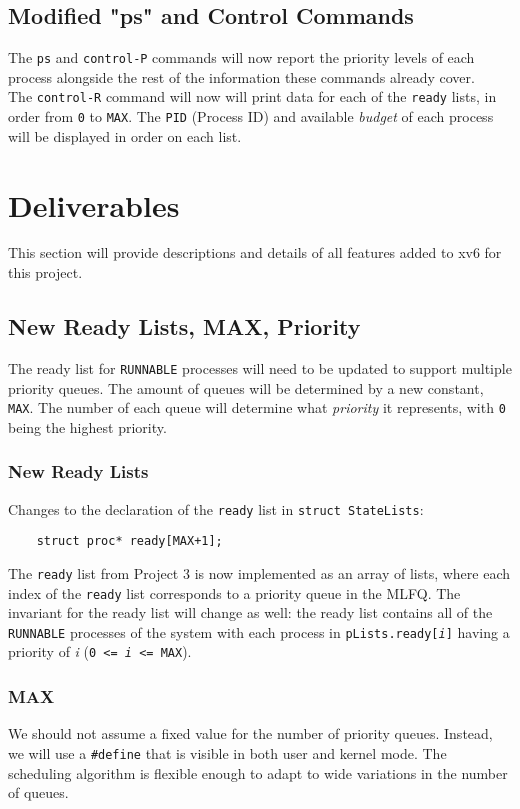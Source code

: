 \documentclass[11pt,letterpaper]{report}
\begin{document}
	\subsection{Modified "ps" and Control Commands}
	
	The {\tt ps} and {\tt control-P} commands will now report the priority levels of each process alongside the rest of the information these commands already cover.\\
	The {\tt control-R} command will now will print data for each of the {\tt ready} lists, in order from {\tt 0} to {\tt MAX}. The {\tt PID} (Process ID) and available \emph{budget} of each process will be displayed in order on each list.
	
	\newpage
	\section{Deliverables}
	This section will provide descriptions and details of all features added to xv6 for this project.
	
	\subsection{New Ready Lists, MAX, Priority}
	The ready list for {\tt RUNNABLE} processes will need to be updated to support multiple priority queues. The amount of queues will be determined by a new constant, {\tt MAX}. The number of each queue will determine what \emph{priority} it represents, with {\tt 0} being the highest priority.
	
	\subsubsection{New Ready Lists}
	Changes to the declaration of the {\tt ready} list in {\tt struct StateLists}:
	\begin{verbatim}
	struct proc* ready[MAX+1];
	\end{verbatim}
	The {\tt ready} list from Project 3 is now implemented as an array of lists, where each index of the {\tt ready} list corresponds to a priority queue in the MLFQ. The invariant for the ready list will change as well: the ready list contains all of the {\tt RUNNABLE} processes of the system with each process in {\tt pLists.ready[\emph{i}]} having a priority of \emph{i} ({\tt 0 <= \emph{i} <= MAX}).
	
	\subsubsection{MAX}
	We should not assume a fixed value for the number of priority queues. Instead, we will use a {\tt \#define} that is visible in both user and kernel mode. The scheduling algorithm is flexible enough to adapt to wide variations in the number of queues.
	
\end{document}
